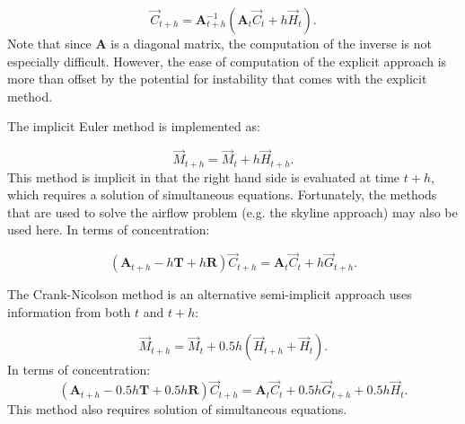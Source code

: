 \documentclass[10pt]{report}
\newcommand{\mat}[1]{\ensuremath{\mathbf{#1}}}
\begin{document}
\begin{equation}
\vec{C}_{t+h} = \mat{A}_{t+h}^{-1}\left( \mat{A}_{t}\vec{C}_t + h\vec{H}_t\right).
\end{equation}
\noindent
Note that since $\mat{A}$ is a diagonal matrix, the computation of the inverse is not
especially difficult. However, the ease of computation of the explicit approach is more
than offset by the potential for instability that comes with the explicit method.

The implicit Euler method is implemented as:

\begin{equation}
\vec{M}_{t+h} = \vec{M}_t + h\vec{H}_{t+h}.
\end{equation}
\noindent
This method is implicit in that the right hand side is evaluated at time $t+h$, which
requires a solution of simultaneous equations. Fortunately, the methods that are used
to solve the airflow problem (e.g. the skyline approach) may also be used here. In terms
of concentration:

\begin{equation}
\left(\mat{A}_{t+h} -h\mat{T} +h\mat{R}\right)\vec{C}_{t+h}
 = \mat{A}_{t}\vec{C}_t + h\vec{G}_{t+h}.
\end{equation}

The Crank-Nicolson method is an alternative semi-implicit approach uses information
from both $t$ and $t+h$:

\begin{equation}
\vec{M}_{t+h} = \vec{M}_t + 0.5h(\vec{H}_{t+h} + \vec{H}_t).
\end{equation}
\noindent
In terms of concentration:
\begin{equation}
\left(\mat{A}_{t+h} - 0.5h\mat{T} + 0.5h\mat{R}\right)\vec{C}_{t+h}
 = \mat{A}_{t}\vec{C}_t + 0.5h\vec{G}_{t+h} + 0.5h\vec{H}_t.
\end{equation}
\noindent
This method also requires solution of simultaneous equations.
\end{document}
